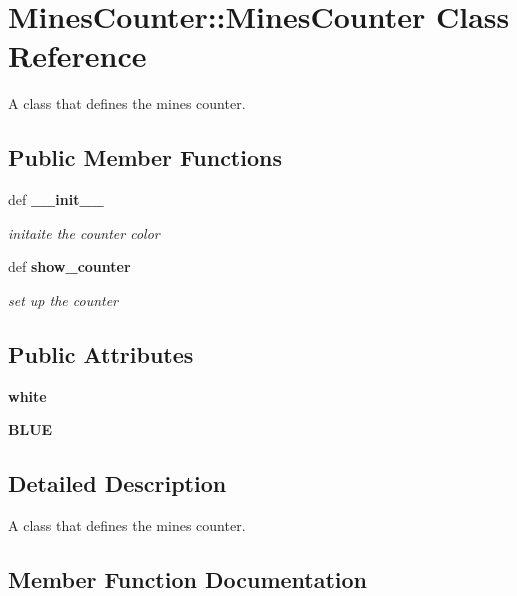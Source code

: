 \section{Mines\-Counter::Mines\-Counter Class Reference}
\label{classMinesCounter_1_1MinesCounter}
A class that defines the mines counter.  


\subsection*{Public Member Functions}
\begin{CompactItemize}
\item 
def \bf{\_\-\_\-init\_\-\_\-}
\begin{CompactList}\small\item\em initaite the counter color \item\end{CompactList}\item 
def \bf{show\_\-counter}
\begin{CompactList}\small\item\em set up the counter \item\end{CompactList}\end{CompactItemize}
\subsection*{Public Attributes}
\begin{CompactItemize}
\item 
\textbf{white}\label{classMinesCounter_1_1MinesCounter_f785dbb77e84de60d8637db22777ae64}

\item 
\textbf{BLUE}\label{classMinesCounter_1_1MinesCounter_4c26d86f8d85eba99a2aecfa99650ae8}

\end{CompactItemize}


\subsection{Detailed Description}
A class that defines the mines counter. 



\subsection{Member Function Documentation}
